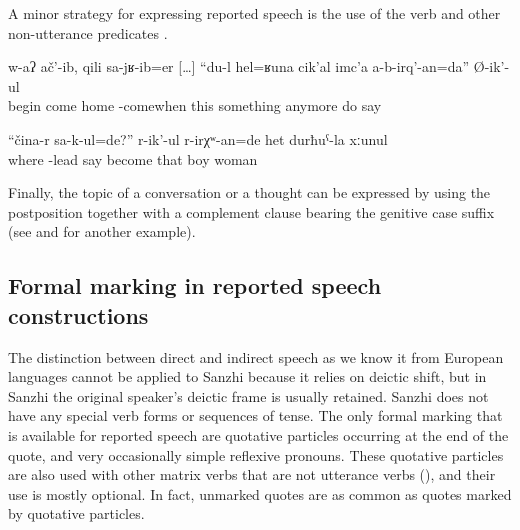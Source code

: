 A minor strategy for expressing reported speech is the use of the verb   and other non-utterance predicates .
%
\begin{exe}
	\ex	\label{ex:He began when he came home, I will not anymore do things like this}
	\gll	w-aʔ	ač'-ib,	qili	sa-jʁ-ib=er	[\ldots]	``du-l	hel=ʁuna	cik'al	imc'a	a-b-irq'-an=da''	Ø-ik'-ul\\
		begin	come	home	-comewhen	{}		this something	anymore	do	say\\
	\glt	{}

	\ex	\label{ex:‎‎‎The daughter-in-law must have asked, From where do you bring the body}
	\gll	``čina-r	sa-k-ul=de?''	r-ik'-ul	r-irχʷ-an=de	het	durħuˁ-la	xːunul	\\
		where	-lead	say	become	that	boy	woman\\
	\glt	{}
\end{exe}

Finally, the topic of a conversation or a thought can be expressed by using the postposition   together with a complement clause bearing the genitive case suffix (see  and  for another example).



\subsection{Formal marking in reported speech constructions}
\label{ssec:Formal marking in reported speech constructions}

The distinction between direct and indirect speech as we know it from European languages cannot be applied to Sanzhi because it relies on deictic shift, but in Sanzhi the original speaker's deictic frame is usually retained. Sanzhi does not have any special verb forms or sequences of tense. The only formal marking that is available for reported speech are quotative particles occurring at the end of the quote, and very occasionally simple reflexive pronouns. These quotative particles are also used with other matrix verbs that are not utterance verbs (), and their use is mostly optional. In fact, unmarked quotes are as common as quotes marked by quotative particles.

